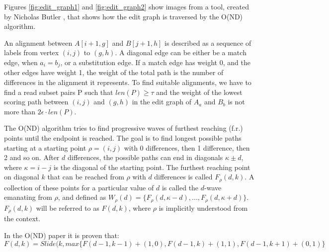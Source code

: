 \documentclass[../thesis.tex]{subfiles}
\begin{document}
Figures \ref{fig:edit_graph1} and \ref{fig:edit_graph2} show images from a tool, created by Nicholas Butler \cite{diff_tutorial}, that shows how the edit graph is traversed by the O(ND) algorithm.



An alignment between $A[i+1,g]$ and $B[j+1,h]$ is described as a sequence of labels from vertex $(i,j)$ to $(g,h)$.
A diagonal edge can be either be a match edge, when $a_i = b_j$, or a substitution edge.
If a match edge has weight 0, and the other edges have weight 1, the weight of the total path is the number of differences in the alignment it represents.
To find suitable alignments, we have to find a read subset pairs P such that $len(P)\ge \tau$ and the weight of the lowest scoring path between $(i,j)$ and $(g,h)$ in the edit graph of $A_a$ and $B_b$ is not more than $2\epsilon\cdot len(P)$.


The O(ND) algorithm tries to find progressive waves of furthest reaching (f.r.) points until the endpoint is reached.
The goal is to find longest possible paths starting at a starting point $\rho = (i,j)$ with 0 differences, then 1 difference, then 2 and so on.
After $d$ differences, the possible paths can end in diagonals $\kappa \pm d$, where $\kappa = i-j$ is the diagonal of the starting point.
The furthest reaching point on diagonal $k$ that can be reached from $\rho$ with $d$ differences is called $F_\rho(d,k)$.
A collection of these points for a particular value of $d$ is called the $d$-wave emanating from $\rho$, and defined as $W_\rho(d) = \{F_\rho(d,\kappa-d),...,F_\rho(d,\kappa+d)\}$.
$F_\rho(d,k)$ will be referred to as $F(d,k)$, where $\rho$ is implicitly understood from the context.

In the O(ND) paper it is proven that:
\begin{equation}
F(d,k)=Slide(k, max\{F(d-1,k-1)+(1,0), F(d-1,k)+(1,1), F(d-1,k+1)+(0,1)\}
\end{equation}
\end{document}
